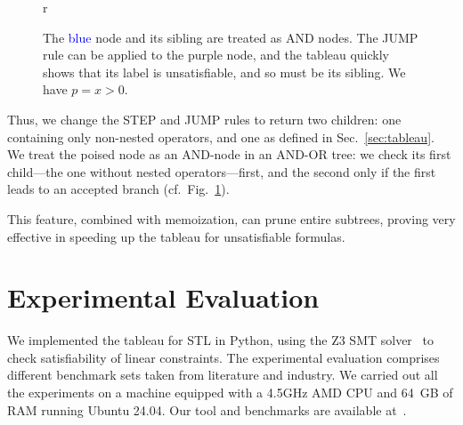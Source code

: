 \documentclass[acmsmall,screen]{acmart}
\begin{document}
\begin{figure}[18]{r}
\footnotesize
{}
\caption{The \textcolor{blue}{blue} node and its sibling are treated as AND nodes.
  The \textsf{JUMP} rule can be applied to the purple node,
  and the tableau quickly shows that its label is unsatisfiable,
  and so must be its sibling. We have $p = x > 0$.}
\label{fig:easy-first-example}
\end{figure}
Thus, we change the  \textsf{STEP} and \textsf{JUMP} rules to return two children:
one containing only non-nested operators, and one as defined in Sec.~\ref{sec:tableau}.
We treat the poised node as an AND-node in an AND-OR tree:
we check its first child---the one without nested operators---first,
and the second only if the first leads to an accepted branch
(cf.\ Fig.~\ref{fig:easy-first-example}).

This feature, combined with memoization, can prune entire subtrees,
proving very effective in speeding up the tableau for unsatisfiable formulas.


\section{Experimental Evaluation}
\label{sec:exp}

We implemented the tableau for STL in Python, using the Z3 SMT solver~\cite{Z3} to check satisfiability of linear constraints.
The experimental evaluation comprises different benchmark sets taken from literature and industry.
We carried out all the experiments on a machine equipped with a 4.5GHz AMD CPU and 64~GB of RAM running Ubuntu 24.04.
Our tool and benchmarks are available at~\cite{stltree}.
\end{document}

